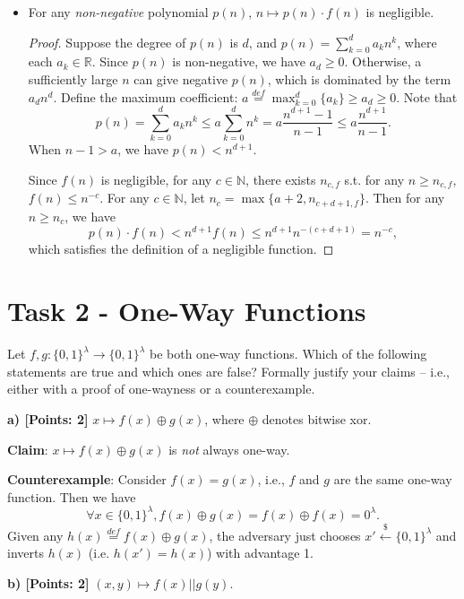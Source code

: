 \documentclass[12pt]{article}
\newcommand{\eqdef}{\stackrel{def}{=}}
\newcommand{\N}{\mathbb{N}}
\newcommand{\R}{\mathbb{R}}
\newcommand{\bits}{\{0,1\}}
\newcommand{\getsr}{\stackrel{\$}{\gets}}
\theoremstyle{definition}
\begin{document}
\begin{itemize}
\item For any \emph{non-negative} polynomial $p(n)$, $n \mapsto p(n)\cdot f(n)$ is negligible.
\begin{proof}
Suppose the degree of $p(n)$ is $d$, and $p(n) = \sum_{k=0}^d a_kn^k$, where each $a_k\in\R$.
Since $p(n)$ is non-negative, we have $a_d \geq 0$. Otherwise, a sufficiently large $n$ can give negative $p(n)$, which is dominated by the term $a_dn^d$.
Define the maximum coefficient: $a \eqdef \max_{k=0}^d \{a_k\} \geq a_d \geq 0$. Note that 
$$p(n) = \sum_{k=0}^d a_kn^k \leq a \sum_{k=0}^d n^k = a \frac{n^{d+1}-1}{n-1} \leq a \frac{n^{d+1}}{n-1}.$$
When $n-1>a$, we have $p(n) < n^{d+1}$. 

Since $f(n)$ is negligible, for any $c\in\N$, there exists $n_{c,f}$ s.t. for any $n\geq n_{c,f}$, $f(n) \leq n^{-c}$. 
For any $c\in\N$, let $n_c = \max\{a+2, n_{c+d+1,f}\}$. Then for any $n\geq n_c$, we have
$$p(n)\cdot f(n) < n^{d+1} f(n) \leq n^{d+1} n^{-(c+d+1)} = n^{-c},$$
which satisfies the definition of a negligible function.
\end{proof}
\end{itemize}

\section{Task 2 - One-Way Functions}
Let $f, g : \bits^\lambda \to \bits^\lambda$ be both one-way functions. Which of the following statements
are true and which ones are false? Formally justify your claims – i.e., either with a proof
of one-wayness or a counterexample.

{\bf a) [Points: 2]} $x \mapsto f(x) \oplus g(x)$, where $\oplus$ denotes bitwise xor.

{\bf Claim}: $x \mapsto f(x) \oplus g(x)$ is \emph{not} always one-way.

{\bf Counterexample}:
Consider $f(x) = g(x)$, i.e., $f$ and $g$ are the same one-way function. Then we have
$$\forall x\in\bits^\lambda, f(x) \oplus g(x) = f(x) \oplus f(x) = 0^\lambda.$$
Given any $h(x) \eqdef f(x) \oplus g(x)$, the adversary just chooses $x' \getsr \bits^\lambda$ and inverts $h(x)$ (i.e. $h(x')=h(x)$) with advantage 1.

{\bf b) [Points: 2]} $(x, y) \mapsto f(x) || g(y)$.
\end{document}
